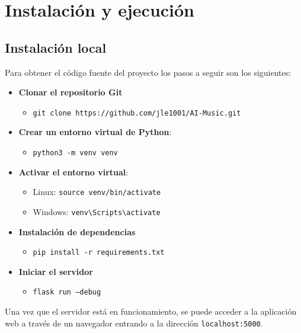 \section{Instalación y ejecución}

\subsection{Instalación local}

Para obtener el código fuente del proyecto los pasos a seguir son los siguientes:

\begin{itemize}
\tightlist

\item \textbf{Clonar el repositorio Git}
	\begin{itemize}
	\tightlist
		\item \texttt{git clone https://github.com/jle1001/AI-Music.git}
	\end{itemize}

\item \textbf{Crear un entorno virtual de Python}: 
	\begin{itemize}
	\tightlist
		\item \texttt{python3 -m venv venv}
	\end{itemize}

\item \textbf{Activar el entorno virtual}: 
	\begin{itemize}
		\item Linux: \texttt{source venv/bin/activate}
		
		\item Windows: \texttt{venv\textbackslash Scripts\textbackslash activate}
	\end{itemize}

\item \textbf{Instalación de dependencias}
	\begin{itemize}
	\tightlist
		\item \texttt{pip install -r requirements.txt}
	\end{itemize}

\item \textbf{Iniciar el servidor}
	\begin{itemize}
	\tightlist
		\item \texttt{flask run --debug}
	\end{itemize}
\end{itemize}

Una vez que el servidor está en funcionamiento, se puede acceder a la aplicación web a través de un navegador entrando a la dirección \texttt{localhost:5000}.

